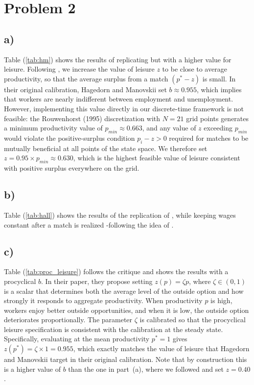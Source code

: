 \documentclass[12pt]{article}
\begin{document}
\section*{Problem 2}
\subsection*{a)}
Table (\ref{tab:hm}) shows the results of replicating \citet{shimer2005} but with 
a higher value for leisure. 
Following \citet{hagedorn2008}, we increase the value of leisure $z$
to be close to average productivity, so that the average surplus from a match $(p^* - z)$
is small. In their original calibration, Hagedorn and Manovskii set $b \approx 0.955 $, 
which implies that workers are nearly indifferent between employment and unemployment. 
However, implementing this value directly in our discrete-time framework is not feasible: 
the Rouwenhorst (1995) discretization with $N = 21$
grid points generates a minimum productivity value of $p_{min} \approx 0.663$, 
and any value of $z$ exceeding $p_{min}$
would violate the positive-surplus condition $p_i - z > 0 $
required for matches to be mutually beneficial at all points of the state space. 
We therefore set $z = 0.95 \times p_{min} \approx 0.630$, which is the highest feasible value 
of leisure consistent with positive surplus everywhere on the grid. \\

\subsection*{b)}
Table (\ref{tab:hall}) shows the results of the replication of \citet{shimer2005} , while 
keeping wages constant after a match is realized -following the idea of \citet{hall2005}. \\

\subsection*{c)}
Table (\ref{tab:proc_leisure}) follows the \citet{chodorowreich2016}
critique and shows the results with a procyclical $b$.
In their paper, they propose
setting $z(p) = \zeta p$, where $\zeta \in (0,1)$ is a scalar that determines
both the average level of the outside option and how strongly it responds to
aggregate productivity. When productivity $p$ is high, workers enjoy better
outside opportunities, and when it is low, the outside option deteriorates
proportionally. The parameter $\zeta$ is calibrated so that the procyclical
leisure specification is consistent with the \citet{hagedorn2008} calibration
at the steady state. Specifically, evaluating at the mean productivity $p^{*}=1$
gives $z(p^{*}) = \zeta \times 1 = 0.955$, which exactly matches the value of
leisure that Hagedorn and Manovskii target in their original calibration. Note
that by construction this is a higher value of $b$ than the one in part~(a),
where we followed \citet{shimer2005} and set $z = 0.40$. \\
\end{document}

